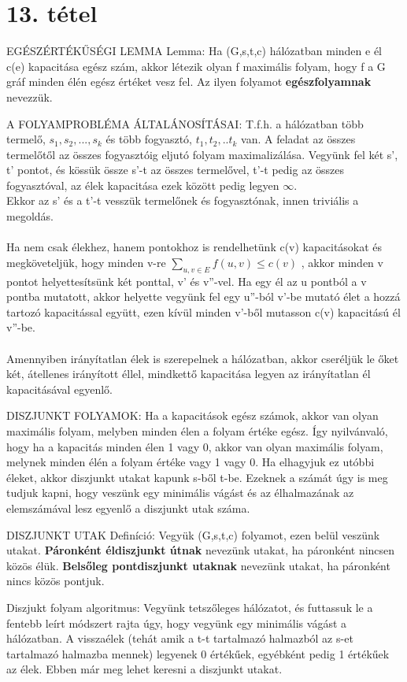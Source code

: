 \section{13. tétel}

\begin{tetel}{
EGÉSZÉRTÉKŰSÉGI LEMMA Lemma}: Ha (G,s,t,c) hálózatban minden e él c(e) kapacitása egész szám, akkor létezik olyan f maximális folyam, hogy f a G gráf minden élén egész értéket vesz fel. Az ilyen folyamot \textbf{egészfolyamnak} nevezzük.
\end{tetel}
\begin{tetel}{
A FOLYAMPROBLÉMA ÁLTALÁNOSÍTÁSAI}: T.f.h. a hálózatban több termelő, $s_1, s_2,...,s_k$ és több fogyasztó, $t_1, t_2,..t_k$ van. A feladat az összes termelőtől az összes fogyasztóig eljutó folyam maximalizálása. Vegyünk fel két s', t' pontot, és kössük össze s'-t az összes termelővel, t'-t pedig az összes fogyasztóval, az élek kapacitása ezek között pedig legyen $\infty$.
\\
Ekkor az s' és a t'-t vesszük termelőnek és fogyasztónak, innen triviális a megoldás.
\\
\\
Ha nem csak élekhez, hanem pontokhoz is rendelhetünk c(v) kapacitásokat és megköveteljük, hogy minden v-re
$\sum_{u,v\in E}^{} f(u,v) \leq c(v)$
, akkor minden v pontot helyettesítsünk két ponttal, v' és v''-vel. Ha egy él az u pontból a v pontba mutatott, akkor helyette vegyünk fel egy u''-ból v'-be mutató élet a hozzá tartozó kapacitással együtt, ezen kívül minden v'-ből mutasson c(v) kapacitású él v''-be.
\\
\\
Amennyiben irányítatlan élek is szerepelnek a hálózatban, akkor cseréljük le őket két, átellenes irányított éllel, mindkettő kapacitása legyen az irányítatlan él kapacitásával egyenlő.
\end{tetel}
\begin{tetel}{
DISZJUNKT FOLYAMOK}: Ha a kapacitások egész számok, akkor van olyan maximális folyam, melyben minden élen a folyam értéke egész. Így nyilvánvaló, hogy ha a kapacitás minden élen 1 vagy 0, akkor van olyan maximális folyam, melynek minden élén a folyam értéke vagy 1 vagy 0. Ha elhagyjuk ez utóbbi éleket, akkor diszjunkt utakat kapunk s-ből t-be. Ezeknek a számát úgy is meg tudjuk kapni, hogy veszünk egy minimális vágást és az élhalmazának az elemszámával lesz egyenlő a diszjunkt utak száma.
\end{tetel}
\begin{definicio}{
DISZJUNKT UTAK Definíció}: Vegyük (G,s,t,c) folyamot, ezen belül veszünk utakat. \textbf{Páronként éldiszjunkt útnak} nevezünk utakat, ha páronként nincsen közös élük. \textbf{Belsőleg pontdiszjunkt utaknak} nevezünk utakat, ha páronként nincs közös pontjuk.
\end{definicio}
Diszjukt folyam algoritmus: Vegyünk tetszőleges hálózatot, és futtassuk le a fentebb leírt módszert rajta úgy, hogy vegyünk egy minimális vágást a hálózatban. A visszaélek (tehát amik a t-t tartalmazó halmazból az s-et tartalmazó halmazba mennek) legyenek 0 értékűek, egyébként pedig 1 értékűek az élek. Ebben már meg lehet keresni a diszjunkt utakat.
